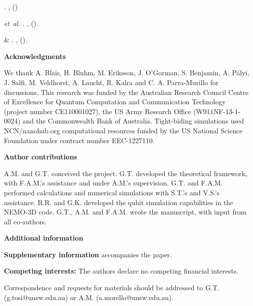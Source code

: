 \documentclass[aps,prb,superscriptaddress,nobibnotes,preprint]{revtex4-1}%
\begin{document}
\begin{thebibliography}{10}
\newblock {}.
\newblock \emph{} \textbf{},
   ()

 \emph{et~al.}
\newblock {}.
\newblock \emph{} \textbf{},
   ().

 \& 
\newblock {}.
\newblock \emph{} \textbf{},
   ().

\end{thebibliography}


\vspace{3mm}
\noindent\textbf{Acknowledgments}

\noindent We thank A. Blais, H. Bluhm, M. Eriksson, J. O'Gorman, S. Benjamin, A. P\'alyi, J. Salfi, M. Veldhorst, A. Laucht, R. Kalra and C. A. Parra-Murillo for discussions. This research was funded by the Australian Research Council Centre of Excellence for Quantum Computation and Communication Technology (project number CE110001027), the US Army Research Office (W911NF-13-1-0024) and the Commonwealth Bank of Australia. Tight-biding simulations used NCN/nanohub.org computational resources funded by the US National Science Foundation under contract number EEC-1227110.


\vspace{3mm}
\noindent\textbf{Author contributions}

\noindent A.M. and G.T. conceived the project.
G.T. developed the theoretical framework, with F.A.M.'s assistance and under A.M.'s supervision.
G.T. and F.A.M. performed calculations and numerical simulations with S.T.'s and V.S.'s assistance.
R.R. and G.K. developed the qubit simulation capabilities in the NEMO-3D code.
G.T., A.M. and F.A.M. wrote the manuscript, with input from all co-authors.


\vspace{3mm}
\noindent \textbf{Additional information}

{\small\noindent \textbf{Supplementary information} accompanies the paper.

\vspace{1mm}
\noindent \textbf{Competing interests:} The authors declare no competing financial interests.

\vspace{1mm}
\noindent Correspondence and requests for materials should be addressed to G.T. (g.tosi@unsw.edu.au) or A.M. (a.morello@unsw.edu.au).
}
\end{document}
